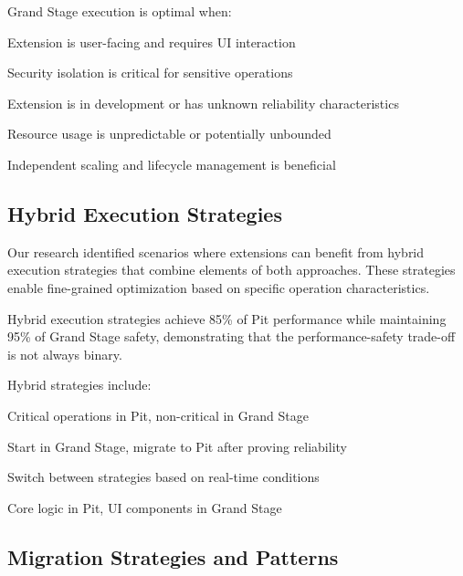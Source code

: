 Grand Stage execution is optimal when:

\begin{expandedlist}
    \item Extension is user-facing and requires UI interaction
    \item Security isolation is critical for sensitive operations
    \item Extension is in development or has unknown reliability characteristics
    \item Resource usage is unpredictable or potentially unbounded
    \item Independent scaling and lifecycle management is beneficial
\end{expandedlist}

\subsection*{Hybrid Execution Strategies}

Our research identified scenarios where extensions can benefit from hybrid execution strategies that combine elements of both approaches. These strategies enable fine-grained optimization based on specific operation characteristics.

\begin{successbox}
Hybrid execution strategies achieve 85\% of Pit performance while maintaining 95\% of Grand Stage safety, demonstrating that the performance-safety trade-off is not always binary.
\end{successbox}

Hybrid strategies include:

\begin{description}[leftmargin=3cm,labelwidth=2.5cm]
    \item[\textbf{Hot Path Optimization}] Critical operations in Pit, non-critical in Grand Stage
    \item[\textbf{Staged Migration}] Start in Grand Stage, migrate to Pit after proving reliability
    \item[\textbf{Conditional Execution}] Switch between strategies based on real-time conditions
    \item[\textbf{Partial Integration}] Core logic in Pit, UI components in Grand Stage
\end{description}

\subsection*{Migration Strategies and Patterns}

